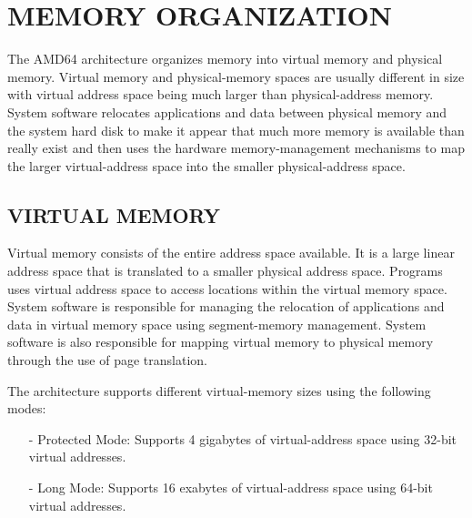 \section{MEMORY ORGANIZATION}

The AMD64 architecture organizes memory into virtual memory and physical memory\cite{SS:AMD64-V2}. Virtual memory and physical-memory spaces are usually different in size with virtual address space being much larger than physical-address memory.  System software relocates applications and data between physical memory and the system hard disk to make it appear that much more memory is available than really exist and then uses the hardware memory-management mechanisms to map the larger virtual-address space into the smaller physical-address space.

\subsection {VIRTUAL MEMORY}
Virtual memory consists of the entire address space available. It is a large linear address space that is translated to a smaller physical address space. Programs uses virtual address space to access locations within the virtual memory space. System software is responsible for managing the relocation of applications and data in virtual memory space using segment-memory management. System software is also responsible for mapping virtual memory to physical memory through the use of page translation.

The architecture supports different virtual-memory sizes using the following modes:
\begin{itemize}

\item[-] Protected Mode: Supports 4 gigabytes of virtual-address space using 32-bit virtual  addresses.

\item[-] Long Mode: Supports 16 exabytes of virtual-address space using 64-bit virtual addresses.
\end{itemize}

